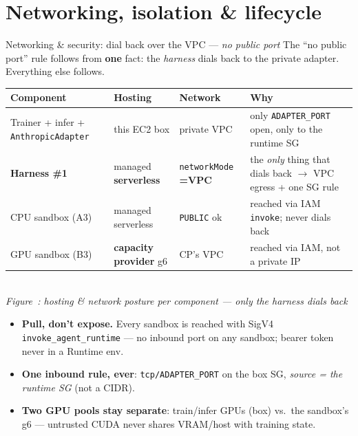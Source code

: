 \documentclass[aspectratio=169]{beamer}
\newcounter{deckfig}
\newcommand{\figtag}[1]{\refstepcounter{deckfig}%
  {\scriptsize\itshape Figure~\thedeckfig: #1}}
\begin{document}
\section{Networking, isolation \& lifecycle}

\begin{frame}{Networking \& security: dial back over the VPC --- \emph{no public port}}
  \footnotesize The ``no public port'' rule follows from \textbf{one} fact: the \emph{harness} dials
  back to the private adapter. Everything else follows.
  \begin{center}\scriptsize
  \begin{tabular}{@{}p{2.9cm}p{2.4cm}p{2.0cm}p{4.0cm}@{}}
    \toprule
    \textbf{Component} & \textbf{Hosting} & \textbf{Network} & \textbf{Why} \\
    \midrule
    Trainer + infer + \texttt{AnthropicAdapter} & this EC2 box & private VPC &
      only \texttt{ADAPTER\_PORT} open, only to the runtime SG \\
    \textbf{Harness \#1} & managed \textbf{serverless} & \texttt{networkMode} \textbf{=VPC} &
      the \emph{only} thing that dials back $\to$ VPC egress + one SG rule \\
    CPU sandbox (A3) & managed serverless & \texttt{PUBLIC} ok &
      reached via IAM \texttt{invoke}; never dials back \\
    GPU sandbox (B3) & \textbf{capacity provider} g6 & CP's VPC & reached via IAM, not a private IP \\
    \bottomrule
  \end{tabular}
  \\[0.1em]\figtag{hosting \& network posture per component --- only the harness dials back}
  \end{center}
  \vspace{0.2em}
  \begin{itemize}\setlength\itemsep{0.1em}
    \item \textbf{Pull, don't expose.} Every sandbox is reached with SigV4 \texttt{invoke\_agent\_runtime}
      --- no inbound port on any sandbox; bearer token never in a Runtime env.
    \item \textbf{One inbound rule, ever}: \texttt{tcp/ADAPTER\_PORT} on the box SG, \emph{source = the
      runtime SG} (not a CIDR).
    \item \textbf{Two GPU pools stay separate}: train/infer GPUs (box) vs.\ the sandbox's g6 ---
      untrusted CUDA never shares VRAM/host with training state.
  \end{itemize}
\end{frame}
\end{document}
